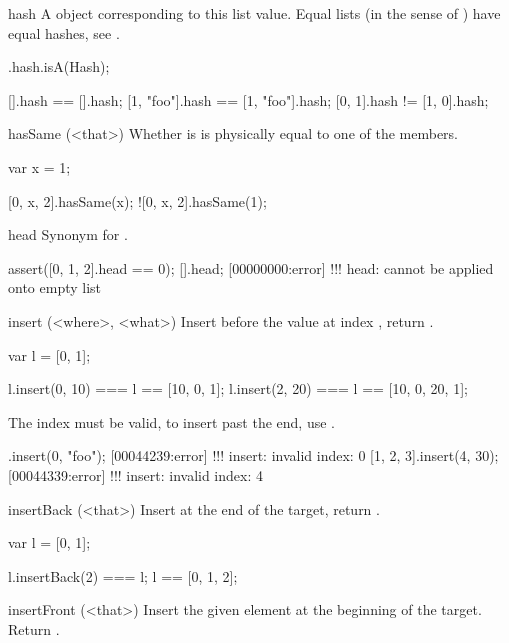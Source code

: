 \begin{urbiscriptapi}
\item[hash] A  object corresponding to this list
  value. Equal lists (in the sense of ) have equal hashes, see
  .

\begin{urbiassert}
[].hash.isA(Hash);

        [].hash == [].hash;
[1, "foo"].hash == [1, "foo"].hash;
    [0, 1].hash != [1, 0].hash;
\end{urbiassert}


\item[hasSame](<that>)%
  Whether \that is is physically equal to one of the members.
\begin{urbiassert}
var x = 1;

 [0, x, 2].hasSame(x);
![0, x, 2].hasSame(1);
\end{urbiassert}


\item[head]
  Synonym for .
\begin{urbiscript}
assert([0, 1, 2].head == 0);
[].head;
[00000000:error] !!! head: cannot be applied onto empty list
\end{urbiscript}


\item[insert](<where>, <what>)%
  Insert  before the value at index , return
  \this.
\begin{urbiassert}
var l = [0, 1];

l.insert(0, 10) === l == [10, 0, 1];
l.insert(2, 20) === l == [10, 0, 20, 1];
\end{urbiassert}

  The index must be valid, to insert past the end, use .
\begin{urbiscript}
[].insert(0, "foo");
[00044239:error] !!! insert: invalid index: 0
[1, 2, 3].insert(4, 30);
[00044339:error] !!! insert: invalid index: 4
\end{urbiscript}


\item[insertBack](<that>)%
  Insert \that at the end of the target, return \this.

\begin{urbiassert}
var l = [0, 1];

l.insertBack(2) === l;
l == [0, 1, 2];
\end{urbiassert}


\item[insertFront](<that>)%
  Insert the given element at the beginning of the target.  Return \this.


\end{urbiscriptapi}
